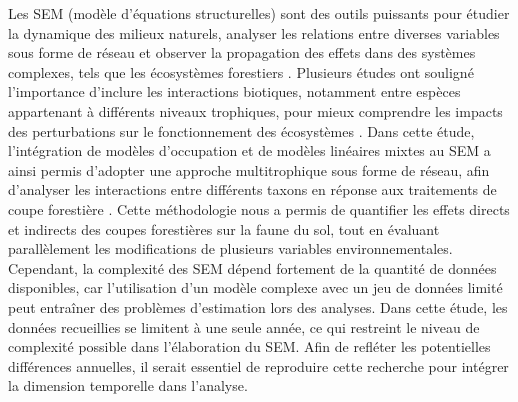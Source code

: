 Les SEM (modèle d’équations structurelles) sont des outils puissants pour étudier la dynamique des milieux naturels, analyser les relations entre diverses variables sous forme de réseau et observer la propagation des effets dans des systèmes complexes, 
tels que les écosystèmes forestiers \citep{graceSpecificationStructuralEquation2010}.  
Plusieurs études ont souligné l’importance d’inclure les interactions biotiques, notamment entre espèces appartenant à différents niveaux trophiques, pour mieux comprendre les impacts des perturbations 
sur le fonctionnement des écosystèmes \citep{Thebault2003Foodwebconstraints,Seibold2018necessitymultitrophic,Laigle2021Directindirect}.  
Dans cette étude, l’intégration de modèles d’occupation et de modèles linéaires mixtes au SEM a ainsi permis d’adopter une approche multitrophique sous forme de réseau, 
afin d’analyser les interactions entre différents taxons en réponse aux traitements de coupe forestière \citep{josephIntegratingOccupancyModels2016}.  
Cette méthodologie nous a permis de quantifier les effets directs et indirects des coupes forestières sur la faune du sol, tout en évaluant parallèlement les modifications de plusieurs variables environnementales. 
Cependant, la complexité des SEM dépend fortement de la quantité de données disponibles, car l’utilisation d’un modèle complexe avec un jeu de données limité peut entraîner des problèmes d’estimation lors des analyses.  
Dans cette étude, les données recueillies se limitent à une seule année, ce qui restreint le niveau de complexité possible dans l'élaboration du SEM. 
Afin de refléter les potentielles différences annuelles, il serait essentiel de reproduire cette recherche pour intégrer la dimension temporelle dans l’analyse.

